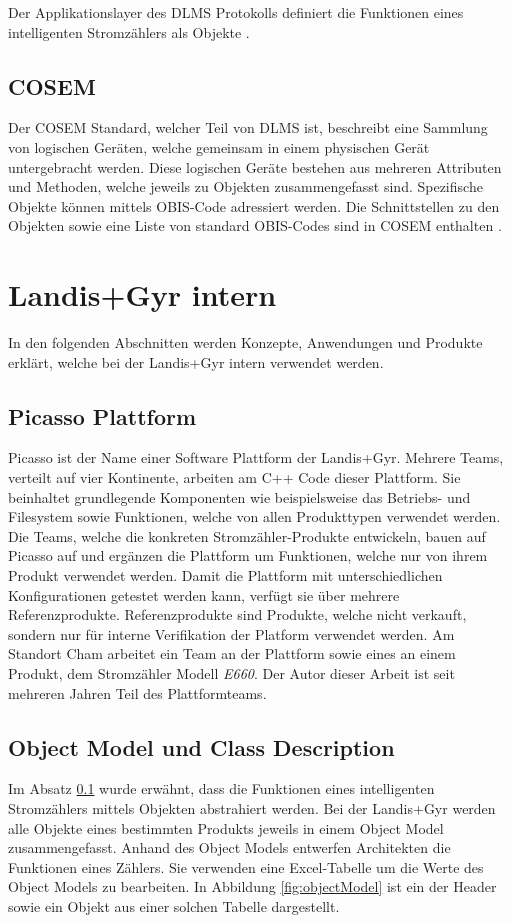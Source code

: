 Der Applikationslayer des \ac{DLMS} Protokolls definiert die Funktionen eines intelligenten Stromzählers als Objekte \parencite{vyas2012advance}.

\subsection{COSEM}\label{cosem}
Der \ac{COSEM} Standard, welcher Teil von \ac{DLMS} ist, beschreibt eine Sammlung von logischen Geräten, welche gemeinsam in einem physischen Gerät untergebracht werden.
Diese logischen Geräte bestehen aus mehreren Attributen und Methoden, welche jeweils zu Objekten zusammengefasst sind.
Spezifische Objekte können mittels \ac{OBIS}-Code adressiert werden.
Die Schnittstellen zu den Objekten sowie eine Liste von standard \ac{OBIS}-Codes sind in \ac{COSEM} enthalten  \parencite{vyas2012advance}.


\section{Landis+Gyr intern}\label{lgintern}
In den folgenden Abschnitten werden Konzepte, Anwendungen und Produkte erklärt, welche bei der Landis+Gyr intern verwendet werden.

\subsection{Picasso Plattform}\label{picasso}
Picasso ist der Name einer Software Plattform der Landis+Gyr.
Mehrere Teams, verteilt auf vier Kontinente, arbeiten am C++ Code dieser Plattform.
Sie beinhaltet grundlegende Komponenten wie beispielsweise das Betriebs- und Filesystem sowie Funktionen, welche von allen Produkttypen verwendet werden.
Die Teams, welche die konkreten Stromzähler-Produkte entwickeln, bauen auf Picasso auf und ergänzen die Plattform um Funktionen, welche nur von ihrem Produkt verwendet werden.
Damit die Plattform mit unterschiedlichen Konfigurationen getestet werden kann, verfügt sie über mehrere Referenzprodukte.
Referenzprodukte sind Produkte, welche nicht verkauft, sondern nur für interne Verifikation der Platform verwendet werden.
Am Standort Cham arbeitet ein Team an der Plattform sowie eines an einem Produkt, dem Stromzähler Modell \textit{E660}.
Der Autor dieser Arbeit ist seit mehreren Jahren Teil des Plattformteams.



\subsection{Object Model und Class Description}\label{objectModelsClassDescriptions}
Im Absatz \ref{cosem} wurde erwähnt, dass die Funktionen eines intelligenten Stromzählers mittels Objekten abstrahiert werden.
Bei der Landis+Gyr werden alle Objekte eines bestimmten Produkts jeweils in einem Object Model zusammengefasst.
Anhand des Object Models entwerfen Architekten die Funktionen eines Zählers.
Sie verwenden eine Excel-Tabelle um die Werte des Object Models zu bearbeiten.
In Abbildung \ref{fig:objectModel} ist ein der Header sowie ein Objekt aus einer solchen Tabelle dargestellt.

